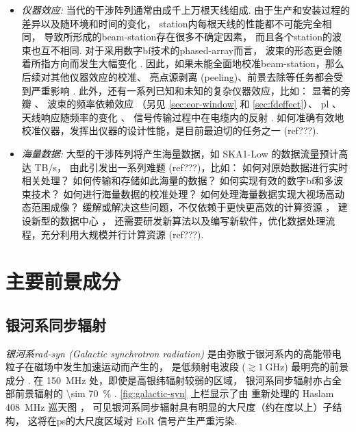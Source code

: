 \begin{itemize}
\item
\emph{仪器效应:}
当代的干涉阵列通常由成千上万根天线组成. 由于生产和安装过程的差异以及随环境和时间的变化，
\ac{station}内每根天线的性能都不可能完全相同，
导致所形成的\ac{beam-station}存在很多不确定因素，
而且各个\ac{station}的波束也互不相同.
对于采用数字\ac{bf}技术的\ac{phased-array}而言，
波束的形态更会随着所指方向而发生大幅变化
\cite{smirnov2011iii,vanWeeren2016,jagannathan2017}.
因此，如果未能全面地校准\ac{beam-station}，那么后续对其他仪器效应的校准、
亮点源剥离 (peeling)、前景去除等任务都会受到严重影响 \cite{noordam2004,neben2016}.
此外，还有一系列已知和未知的复杂仪器效应，比如：
显著的旁瓣 \cite{thyagarajan2015,mort2017}、
波束的频率依赖效应 \cite{liu2009ps,datta2010,morales2012}
（另见 \autoref{sec:eor-window} 和 \autoref{sec:fdeffect}）、
\ac{pl} \cite{asad2015,asad2016,asad2018,lenc2017}、
天线响应随频率的变化 \cite{bernardi2015,trott2017}、
信号传输过程中在电缆内的反射 \cite{beardsley2016}.
如何准确有效地校准仪器，发挥出仪器的设计性能，是目前最迫切的任务之一
\cite{wijnholds2010} (ref???).

\item
\emph{海量数据:}
大型的干涉阵列将产生海量数据，如 SKA1-Low 的数据流量预计高达 TB/s，
由此引发出一系列难题 \cite{norris2011} (ref???)，比如：
如何对原始数据进行实时相关处理？
如何传输和存储如此海量的数据？
如何实现有效的数字\ac{bf}和多波束技术？
如何进行海量数据的校准处理？
如何处理海量数据实现大视场高动态范围成像？
缓解或解决这些问题，不仅依赖于更快更高效的计算资源 \cite{magro2014,vermij2017}，
建设新型的数据中心 \cite{chrysostomou2018}，
还需要研发新算法以及编写新软件，优化数据处理流程，充分利用大规模并行计算资源
\cite{morales2009,gunst2018} (ref???).

\end{itemize}


\section{主要前景成分}
\label{sec:fg-intro}

\subsection{银河系同步辐射}

\emph{银河系\acs{rad-syn} (Galactic synchrotron radiation)}
是由弥散于银河系内的高能带电粒子在磁场中发生加速运动而产生的，
是低频射电波段 ($\gtrsim \SI{1}{\GHz}$) 最明亮的前景成分
\cite{bernardi2009,ghosh2012}.
在 \SI{150}{\MHz} 处，即使是高银纬辐射较弱的区域，
银河系同步辐射亦占全部前景辐射的 \SI{\sim 70}{\percent} \cite{shaver1999}.
\autoref{fig:galactic-syn} 上栏显示了由 
重新处理的 Haslam \SI{408}{\MHz} 巡天图 \cite{haslam1982}，
可见银河系同步辐射具有明显的大尺度（约在度以上）子结构，
这将在\ac{ps}的大尺度区域对 EoR 信号产生严重污染.

